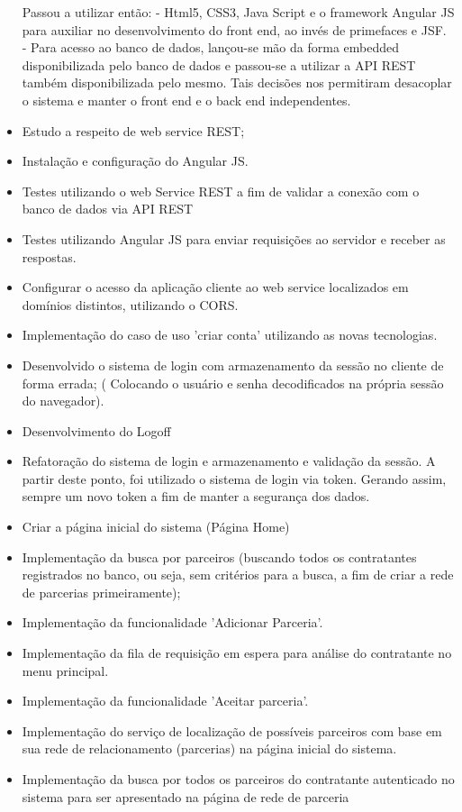 \begin{itemize}
			Passou a utilizar então:
			- Html5, CSS3, Java Script e o framework Angular JS para auxiliar no desenvolvimento do front end, ao invés de primefaces e JSF.
			- Para acesso ao banco de dados, lançou-se mão da forma embedded disponibilizada pelo banco de dados e passou-se a utilizar a API REST também disponibilizada pelo mesmo. Tais decisões nos permitiram desacoplar o sistema e manter o front end e o back end independentes.
		\item Estudo a respeito de web service REST;
		\item Instalação e configuração do Angular JS. 
		\item Testes utilizando o web Service REST a fim de validar a conexão com o banco de dados via API REST 
		\item Testes utilizando Angular JS para enviar requisições ao servidor e receber as respostas. 
		\item Configurar o acesso da aplicação cliente ao web service localizados em domínios distintos, utilizando o CORS. 
		\item Implementação do caso de uso 'criar conta' utilizando as novas tecnologias.
		\item Desenvolvido o sistema de login com armazenamento da sessão no cliente de forma errada; ( Colocando o usuário e senha decodificados na própria sessão do navegador).
		\item Desenvolvimento do Logoff
		\item Refatoração do sistema de login e armazenamento e validação da sessão. A partir deste ponto, foi utilizado o sistema de login via token. Gerando assim, sempre um novo token a fim de manter a segurança dos dados. 
		\item Criar a página inicial do sistema (Página Home)
		\item Implementação da busca por parceiros (buscando todos os contratantes registrados no banco, ou seja, sem critérios para a busca, a fim de criar a rede de parcerias primeiramente);
		\item Implementação da funcionalidade 'Adicionar Parceria'.
		\item Implementação da fila de requisição em espera para análise do contratante no menu principal.
		\item Implementação da funcionalidade 'Aceitar parceria'.
		\item Implementação do serviço de localização de possíveis parceiros com base em sua rede de relacionamento (parcerias) na página inicial do sistema.
		\item Implementação da busca por todos os parceiros do contratante autenticado no sistema para ser apresentado na página de rede de parceria

\end{itemize}

